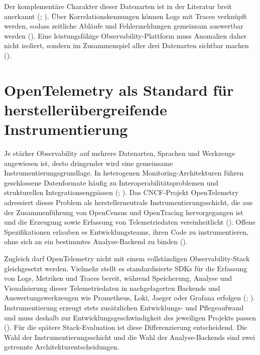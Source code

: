 Der komplementäre Charakter dieser Datenarten ist in der Literatur breit anerkannt (\cite[S.~6]{li2022enjoy}; \cite[S.~272]{abieba2025advanced}). Über Korrelationskennungen können Logs mit Traces verknüpft werden, sodass zeitliche Abläufe und Fehlermeldungen gemeinsam auswertbar werden (\cite[S.~10]{albuquerque2025tracing}). Eine leistungsfähige Observability-Plattform muss Anomalien daher nicht isoliert, sondern im Zusammenspiel aller drei Datenarten sichtbar machen (\cite[S.~1--4]{tzanettis2022data}).
 
\newpage 
\section{OpenTelemetry als Standard für herstellerübergreifende Instrumentierung}
 
Je stärker Observability auf mehrere Datenarten, Sprachen und Werkzeuge angewiesen ist, desto dringender wird eine gemeinsame Instrumentierungsgrundlage. In heterogenen Monitoring-Architekturen führen geschlossene Datenformate häufig zu Interoperabilitätsproblemen und strukturellen Integrationsengpässen (\cite[S.~105]{sakinala2025observability}; \cite[S.~17]{giamattei2024monitoring}). Das CNCF-Projekt OpenTelemetry adressiert dieses Problem als herstellerneutrale Instrumentierungsschicht, die aus der Zusammenführung von OpenCensus und OpenTracing hervorgegangen ist und die Erzeugung sowie Erfassung von Telemetriedaten vereinheitlicht (\cite[S.~86911]{usman2022survey}). Offene Spezifikationen erlauben es Entwicklungsteams, ihren Code zu instrumentieren, ohne sich an ein bestimmtes Analyse-Backend zu binden (\cite[S.~22]{li2022enjoy}).
 
Zugleich darf OpenTelemetry nicht mit einem vollständigen Observability-Stack gleichgesetzt werden. Vielmehr stellt es standardisierte SDKs für die Erfassung von Logs, Metriken und Traces bereit, während Speicherung, Analyse und Visualisierung dieser Telemetriedaten in nachgelagerten Backends und Auswertungswerkzeugen wie Prometheus, Loki, Jaeger oder Grafana erfolgen (\cite[S.~106--107]{sakinala2025observability}; \cite[S.~501--502]{gudimetla2025transitioning}). Instrumentierung erzeugt stets zusätzlichen Entwicklungs- und Pflegeaufwand und muss deshalb zur Entwicklungsgeschwindigkeit des jeweiligen Projekts passen (\cite[S.~15]{giamattei2024monitoring}). Für die spätere Stack-Evaluation ist diese Differenzierung entscheidend. Die Wahl der Instrumentierungsschicht und die Wahl der Analyse-Backends sind zwei getrennte Architekturentscheidungen.
 
